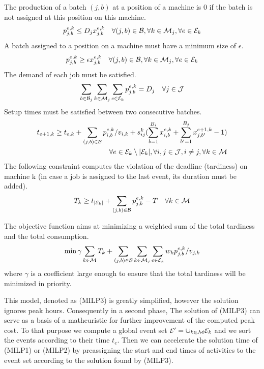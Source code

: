 The production of a batch $(j,b)$ at a position of a machine is 0 if
the batch is not assigned at this position on this machine.
\begin{eqnarray}
p_{j,b}^{e,k}\leq D_jx_{j,b}^{e,k}\quad \forall (j,b)\in{\cal
  B},\forall k\in{\cal M}_j, \forall e\in{\cal E}_k
\end{eqnarray}
A batch assigned to a position on a machine must have a minimum size
of $\epsilon$.
\begin{eqnarray}
p_{j,b}^{e,k}\geq \epsilon x_{j,b}^{e,k}\quad \forall (j,b)\in{\cal
  B},\forall k\in{\cal M}_j, \forall e\in{\cal E}_k
\end{eqnarray}
The demand of each job must be satisfied.
\begin{eqnarray}
\sum_{b\in{\cal B}_j} \sum_{ k\in{\cal M}_j}\sum_{e\in{\cal E}_k}
p^{e,k}_{j,b}=D_j\quad\forall j\in{\cal J}
\end{eqnarray}
Setup times must be satisfied between two consecutive batches.
\begin{eqnarray}
t_{e+1,k}\geq t_{e,k} + \sum_{(j,b)\in{\cal B}} p_{i,b}^{e,k} /
v_{i,k} + s_{ij}^k (
\sum_{b=1}^{B_i}x_{i,b}^{e,k}+\sum_{b'=1}^{B_j}x_{j,b'}^{e+1,k}-1 )
\nonumber\\\quad \forall e\in{\cal E}_k\setminus|{\cal E}_k|, \forall
i,j\in {\cal J}, i\neq j, \forall k\in{\cal M}
\end{eqnarray}
The following constraint computes the violation of the deadline
(tardiness) on machine k (in case a job is assigned to the last event,
its duration must be added).
\begin{eqnarray}
T_k\geq t_{|{\cal E}_k|} +\sum_{(j,b)\in{\cal B}}p_{j,b}^{e,k}- T
\quad \forall k\in{\cal M}
\end{eqnarray}

The objective function aims at minimizing a weighted sum of the total
tardiness and the total consumption.
\begin{eqnarray}
\min \gamma \sum_{k\in{\cal M}}T_k+\sum_{(j,b)\in{\cal B}} \sum_{
  k\in{\cal M}_j}\sum_{e\in{\cal E}_k} w_k p_{j,b}^{e,k} / v_{j,k}
\end{eqnarray}
where $\gamma$ is a coefficient large enough to ensure that the total
tardiness will be minimized in priority.

This model, denoted as (MILP3) is greatly simplified, however the
solution ignores peak hours.  Consequently in a second phase, The
solution of (MILP3) can serve as a basis of a matheuristic for further
improvement of the computed peak cost. To that purpose we compute a
global event set ${\cal E}'=\cup_{k\in{\cal M}}{\cal E}_k$ and we sort
the events according to their time $t_e$.  Then we can accelerate the
solution time of (MILP1) or (MILP2) by preassigning the start and end
times of activities to the event set according to the solution found
by (MILP3).

